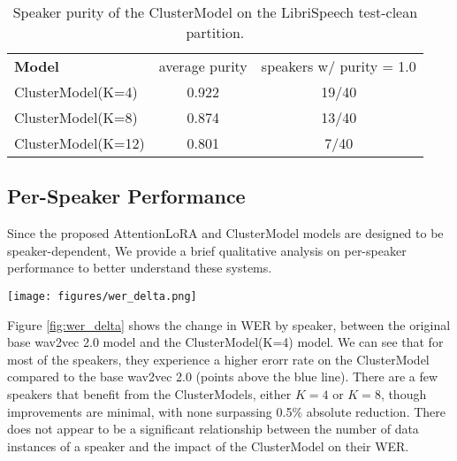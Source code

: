 \begin{table}[htbp]
  \centering
  \begin{tabular}{lcc}
    \toprule
    \textbf{Model} &average purity & speakers w/ purity = 1.0\\
    ClusterModel(K=4) & 0.922 & 19/40 \\
    ClusterModel(K=8) & 0.874 & 13/40 \\
    ClusterModel(K=12) & 0.801 & 7/40 \\
    \bottomrule
  \end{tabular}
  \caption{
    Speaker purity of the ClusterModel on the LibriSpeech test-clean partition.
  }
  \label{tab:speaker_purity}
\end{table}


\subsection{Per-Speaker Performance}

Since the proposed AttentionLoRA and ClusterModel models are designed to be speaker-dependent,
We provide a brief qualitative analysis on per-speaker performance to better understand these systems.

\begin{figure*}[t!]
      \centering
      \texttt{[image: figures/wer\_delta.png]}
      \caption{Difference in WER between ClusterModels and wav2vec 2.0 by speaker on LibriSpeech test-clean.
      The horizontal blue line represents 0, no difference in WER.
      Speakers are ordered along the x axis by the number of utterances they have in the test set.
    Points below the line indicate that the ClusterModel performed better than wav2vec 2.0 on that speaker.
  }
      \label{fig:wer_delta}
\end{figure*}


Figure \ref{fig:wer_delta} shows the change in WER by speaker, between the original base wav2vec 2.0 model and the ClusterModel(K=4) model.
We can see that for most of the speakers, they experience a higher erorr rate on the ClusterModel compared to the base wav2vec 2.0 (points above the blue line).
There are a few speakers that benefit from the ClusterModels, either $K=4$ or $K=8$, though improvements are minimal, with none surpassing 0.5\% absolute reduction.
There does not appear to be a significant relationship between the number of data instances of a speaker and the impact of the ClusterModel on their WER.
